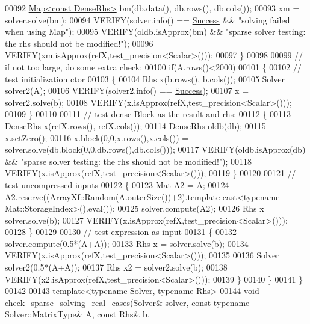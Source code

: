 \begin{DoxyCode}
00092     \hyperlink{group___core___module_class_eigen_1_1_map}{Map<const DenseRhs>} bm(db.data(), db.rows(), db.cols());
00093     xm = solver.solve(bm);
00094     VERIFY(solver.info() == \hyperlink{group__enums_gga85fad7b87587764e5cf6b513a9e0ee5ea52581b035f4b59c203b8ff999ef5fcea}{Success} && \textcolor{stringliteral}{"solving failed when using Map"});
00095     VERIFY(oldb.isApprox(bm) && \textcolor{stringliteral}{"sparse solver testing: the rhs should not be modified!"});
00096     VERIFY(xm.isApprox(refX,test\_precision<Scalar>()));
00097   \}
00098   
00099   \textcolor{comment}{// if not too large, do some extra check:}
00100   \textcolor{keywordflow}{if}(A.rows()<2000)
00101   \{
00102     \textcolor{comment}{// test initialization ctor}
00103     \{
00104       Rhs x(b.rows(), b.cols());
00105       Solver solver2(A);
00106       VERIFY(solver2.info() == \hyperlink{group__enums_gga85fad7b87587764e5cf6b513a9e0ee5ea52581b035f4b59c203b8ff999ef5fcea}{Success});
00107       x = solver2.solve(b);
00108       VERIFY(x.isApprox(refX,test\_precision<Scalar>()));
00109     \}
00110 
00111     \textcolor{comment}{// test dense Block as the result and rhs:}
00112     \{
00113       DenseRhs x(refX.rows(), refX.cols());
00114       DenseRhs oldb(db);
00115       x.setZero();
00116       x.block(0,0,x.rows(),x.cols()) = solver.solve(db.block(0,0,db.rows(),db.cols()));
00117       VERIFY(oldb.isApprox(db) && \textcolor{stringliteral}{"sparse solver testing: the rhs should not be modified!"});
00118       VERIFY(x.isApprox(refX,test\_precision<Scalar>()));
00119     \}
00120 
00121     \textcolor{comment}{// test uncompressed inputs}
00122     \{
00123       Mat A2 = A;
00124       A2.reserve((ArrayXf::Random(A.outerSize())+2).template cast<typename Mat::StorageIndex>().eval());
00125       solver.compute(A2);
00126       Rhs x = solver.solve(b);
00127       VERIFY(x.isApprox(refX,test\_precision<Scalar>()));
00128     \}
00129 
00130     \textcolor{comment}{// test expression as input}
00131     \{
00132       solver.compute(0.5*(A+A));
00133       Rhs x = solver.solve(b);
00134       VERIFY(x.isApprox(refX,test\_precision<Scalar>()));
00135 
00136       Solver solver2(0.5*(A+A));
00137       Rhs x2 = solver2.solve(b);
00138       VERIFY(x2.isApprox(refX,test\_precision<Scalar>()));
00139     \}
00140   \}
00141 \}
00142 
00143 \textcolor{keyword}{template}<\textcolor{keyword}{typename} Solver, \textcolor{keyword}{typename} Rhs>
00144 \textcolor{keywordtype}{void} check\_sparse\_solving\_real\_cases(Solver& solver, \textcolor{keyword}{const} \textcolor{keyword}{typename} Solver::MatrixType& A, \textcolor{keyword}{const} Rhs& b, \textcolor{keyword}{
}
\end{DoxyCode}
